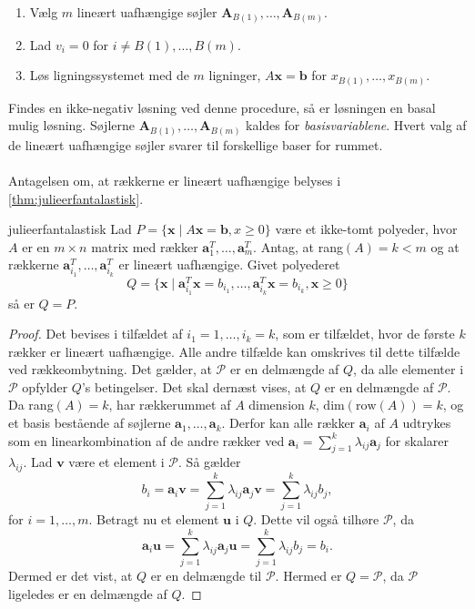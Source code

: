 %
\begin{enumerate}
\item Vælg $m$ lineært uafhængige søjler $\textbf{A}_{B(1)},\ldots,\textbf{A}_{B(m)}.$
\item Lad $v_i=0$ for $i \neq B(1),\ldots,B(m).$
\item Løs ligningssystemet med de $m$ ligninger, $A\textbf{x}=\textbf{b}$ for $x_{B(1)}, \ldots , x_{B(m)}.$
\end{enumerate}
%
Findes en ikke-negativ løsning ved denne procedure, så er løsningen en basal mulig løsning.
Søjlerne $\textbf{A}_{B(1)},\ldots,\textbf{A}_{B(m)}$ kaldes for \textit{basisvariablene}.
Hvert valg af de lineært uafhængige søjler svarer til forskellige baser for rummet.
\\\\
%
Antagelsen om, at rækkerne er lineært uafhængige belyses i \ref{thm:julieerfantalastisk}.
%
\begin{thm}{}{julieerfantalastisk}
Lad $P=\{\textbf{x} \mid  A\textbf{x}=\textbf{b},x \geq 0\}$ være et ikke-tomt polyeder, hvor $A$ er en $m \times n$ matrix med rækker $\textbf{a}^{T}_{1},\ldots,\textbf{a}^{T}_{m}$.
Antag, at rang$(A)=k<m$ og at rækkerne $\textbf{a}^T_{i_1},\ldots,\textbf{a}^T_{i_k}$ er lineært uafhængige. Givet polyederet 
$$Q=\{\textbf{x} \mid \textbf{a}^T_{i_1}\textbf{x}=b_{i_1},\ldots,\textbf{a}^T_{i_k}\textbf{x}=b_{i_k}, \textbf{x} \geq 0  \}$$ 
så er $Q=P$.
\end{thm}
\begin{proof}
Det bevises i tilfældet af $i_1=1,\ldots,i_k=k$, som er tilfældet, hvor de første $k$ rækker er lineært uafhængige. 
Alle andre tilfælde kan omskrives til dette tilfælde ved rækkeombytning. 
Det gælder, at $\mathcal{P}$ er en delmængde af $Q$, da alle elementer i $\mathcal{P}$ opfylder $Q$'s betingelser.
Det skal dernæst vises, at $Q$ er en delmængde af $\mathcal{P}$.
Da rang$(A)=k$, har rækkerummet af $A$ dimension $k$, $\text{dim}(\text{row}(A)) = k$, og et basis bestående af søjlerne $\textbf{a}_1,\ldots,\textbf{a}_k$. 
Derfor kan alle rækker $\textbf{a}_i$ af $A$ udtrykes som en linearkombination af de andre rækker ved $\textbf{a}_i=\sum^{k}_{j=1}\lambda_{ij}\textbf{a}_j$ for skalarer $\lambda_{ij}$. 
Lad $\textbf{v}$ være et element i $\mathcal{P}$. 
Så gælder
$$b_i=\textbf{a}_i\textbf{v}=\sum^{k}_{j=1}\lambda_{ij}\textbf{a}_j\textbf{v}=\sum^{k}_{j=1}\lambda_{ij}b_j,$$
for $i=1,\ldots,m.$
Betragt nu et element $\textbf{u}$ i $Q$. 
Dette vil også tilhøre $\mathcal{P}$, da
$$ \textbf{a}_i\textbf{u}=\sum^{k}_{j=1}\lambda_{ij}\textbf{a}_j\textbf{u}=\sum^{k}_{j=1}\lambda_{ij}b_j=b_i.$$
Dermed er det vist, at $Q$ er en delmængde til $\mathcal{P}$.
Hermed er $Q=\mathcal{P}$, da $\mathcal{P}$ ligeledes er en delmængde af $Q$.
\end{proof} \\